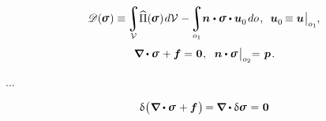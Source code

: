 \nopagebreak
\begin{equation}\label{thecomplementaryenergyfunctional}
\complementaryenergyfunctional (\hspace{-0.1ex}\linearstress\hspace{.1ex})
\equiv \hspace{-0.2ex}
\displaystyle \integral\displaylimits_{\mathcal{V}} \hspace{-0.5ex}
\widehat{\potentialenergydensity}(\hspace{-0.1ex}\linearstress\hspace{.1ex}) \hspace{.2ex} d\mathcal{V} \hspace{.1ex}
- \hspace{-0.2ex}
\displaystyle\integral\displaylimits_{o_1} \hspace{-0.5ex}
\unitnormalvector \hspace{.1ex} \dotp \linearstress \dotp \bm{u}_{\raisemath{-0.1em}{0}} \hspace{.25ex} do
\hspace{.2ex} ,
\hspace{.5em}
\bm{u}_{\raisemath{-0.1em}{0}} \hspace{-0.2ex} \equiv \bm{u} \hspace{.1ex} \bigr|_{o_1}
\hspace{-0.1ex} ,
\end{equation}
%
\nopagebreak\vspace{-0.4em}\begin{equation*}
\boldnabla \dotp \linearstress \hspace{.15ex} + \bm{f} = \hspace{.1ex} \bm{0} \hspace{.1ex} ,
\hspace{.6em}
\unitnormalvector \dotp \linearstress \hspace{.2ex} \bigr|_{o_2} \hspace{-0.66ex} = \hspace{.2ex} \bm{p}
\hspace{.2ex} .
\end{equation*}

...


\noindent
\begin{equation*}\label{the variation of the balance of force equation}
\variation{\hspace{.1ex} \bigl( \hspace{.1ex}
\boldnabla \dotp \linearstress
\hspace{.15ex} +
\bm{f}
\hspace{.15ex} \bigr)} \hspace{-0.2ex}
= \hspace{-0.1ex}
\boldnabla \dotp \variation{\linearstress} \hspace{.15ex}
= \hspace{.1ex} \bm{0}
\end{equation*}

